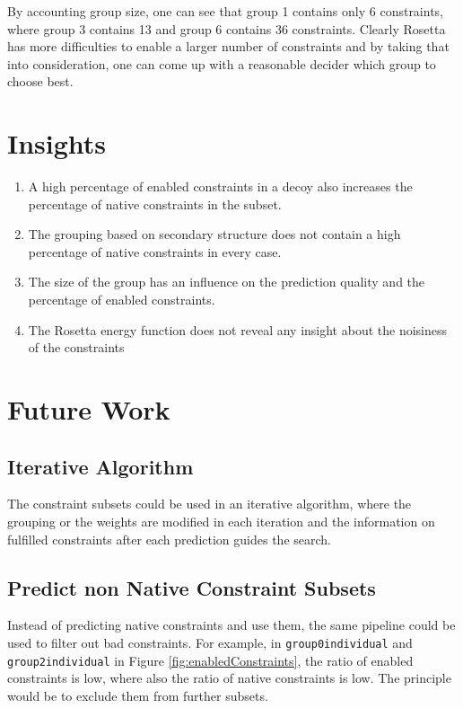 \documentclass[a4paper, 11pt, parskip=half]{scrartcl}
\begin{document}
By accounting group size, one can see that group 1 contains only 6 constraints, where group 3 contains 13 and group 6 contains 36 constraints. Clearly Rosetta has more difficulties to enable a larger number of constraints and by taking that into consideration, one can come up with a reasonable decider which group to choose best.

\section{Insights}

\begin{enumerate}
\item A high percentage of enabled constraints in a decoy also increases the percentage of native constraints in the subset.
\item The grouping based on secondary structure does not contain a high percentage of native constraints in every case.
\item The size of the group has an influence on the prediction quality and the percentage of enabled constraints.
\item The Rosetta energy function does not reveal any insight about the noisiness of the constraints
\end{enumerate}


\section{Future Work}

\subsection{Iterative Algorithm}

The constraint subsets could be used in an iterative algorithm,
where the grouping or the weights are modified in each iteration
and the information on fulfilled constraints after each prediction
guides the search.

\subsection{Predict non Native Constraint Subsets}

Instead of predicting native constraints and use them,
the same pipeline could be used to filter out bad constraints.
For example, in \texttt{group0individual} and \texttt{group2individual}
in Figure \ref{fig:enabledConstraints}, the ratio of enabled constraints is low,
where also the ratio of native constraints is low.
The principle would be to exclude them from further subsets.
\end{document}
